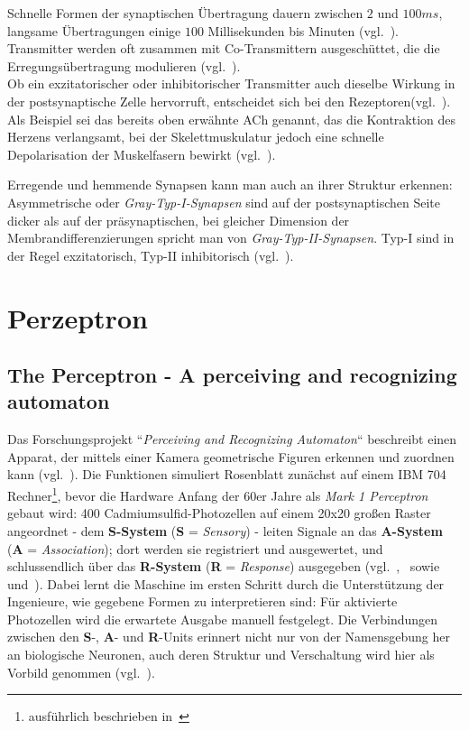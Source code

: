 Schnelle Formen der synaptischen Übertragung dauern zwischen $2$ und $100ms$, langsame Übertragungen einige $100$ Millisekunden bis Minuten (vgl.~\cite[129 f.]{BCP18}). Transmitter werden oft zusammen mit Co-Transmittern ausgeschüttet, die die Erregungsübertragung modulieren (vgl.~\cite[52]{SD07}).\\

Ob ein exzitatorischer oder inhibitorischer Transmitter auch dieselbe Wirkung in der postsynaptische Zelle hervorruft, entscheidet sich bei den Rezeptoren(vgl.~\cite[109]{HS19b}). Als Beispiel sei das bereits oben erwähnte ACh genannt, das die Kontraktion des Herzens verlangsamt, bei der Skelettmuskulatur jedoch eine schnelle Depolarisation der Muskelfasern bewirkt (vgl.~\cite[137]{BCP18}).

Erregende und hemmende Synapsen kann man auch an ihrer Struktur erkennen: Asymmetrische oder \textit{Gray-Typ-I-Synapsen} sind auf der postsynaptischen Seite dicker als auf der präsynaptischen, bei gleicher Dimension der Membrandifferenzierungen spricht man von \textit{Gray-Typ-II-Synapsen}. Typ-I sind in der Regel exzitatorisch, Typ-II inhibitorisch (vgl.~\cite[127 u. 147]{BCP18}).


\section{Perzeptron}\label{appendix:perzeptron}
\subsection*{The Perceptron - A perceiving and recognizing automaton}
Das Forschungsprojekt ``\textit{Perceiving and Recognizing Automaton}`` beschreibt einen Apparat, der mittels einer Kamera geometrische Figuren erkennen und zuordnen kann (vgl.~\cite[3]{Ros57}).
Die Funktionen simuliert Rosenblatt zunächst auf einem IBM 704 Rechner\footnote{
    ausführlich beschrieben in~\cite{Ros60}
}, bevor  die Hardware Anfang der 60er Jahre als \textit{Mark 1 Perceptron} gebaut wird: 400 Cadmiumsulfid-Photozellen auf einem 20x20 großen Raster angeordnet - dem \textbf{S-System} (\textbf{S} = \textit{Sensory}) - leiten Signale an das \textbf{A-System} (\textbf{A} = \textit{Association}); dort werden sie registriert und ausgewertet, und schlussendlich über das \textbf{R-System} (\textbf{R} = \textit{Response}) ausgegeben (vgl.~\cite[4 f.]{Ros57},~\cite[389 f.]{Ros58} sowie~\cite[193, ``Frank Rosenblatt]{Bis06} und~\cite[196, Figure 4.8]{Bis06}).
Dabei lernt die Maschine im ersten Schritt durch die Unterstützung der Ingenieure, wie gegebene Formen zu interpretieren sind: Für aktivierte Photozellen wird die erwartete Ausgabe manuell festgelegt.
Die Verbindungen zwischen den \textbf{S}-, \textbf{A}- und \textbf{R}-Units erinnert nicht nur von der Namensgebung her an biologische Neuronen, auch deren Struktur und Verschaltung wird hier als Vorbild genommen (vgl.~\cite[4]{Ros62}).\\

